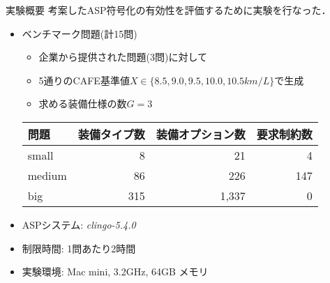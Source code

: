 \documentclass[dvipdfmx, 11pt,]{beamer}
\begin{document}
\begin{frame}{実験概要}
 考案したASP符号化の有効性を評価するために実験を行なった．
 \begin{itemize}
  \item ベンチマーク問題(計15問)
	\begin{itemize}
	 \item 企業から提供された問題(3問)に対して
	 \item 5通りのCAFE基準値$X \in \{8.5, 9.0, 9.5, 10.0, 10.5km/L\}$で生成
	 \item 求める装備仕様の数$G = 3$
	\end{itemize}
	\begin{exampleblock}\small
	 \centering
	 \begin{tabular}{ l|r r r }
	  問題		& 装備タイプ数	& 装備オプション数& 要求制約数 	\\ \hline
	  small	& 8			& 21		& 4		\\
	  medium	& 86		& 226		& 147	\\
	  big		& 315		& 1,337		& 0		\\
	 \end{tabular}
	\end{exampleblock}
  \item ASPシステム: \textit{clingo-5.4.0}
  \item 制限時間: 1問あたり2時間
  \item 実験環境: Mac mini, 3.2GHz, 64GB メモリ
 \end{itemize}
\end{frame}
\end{document}
